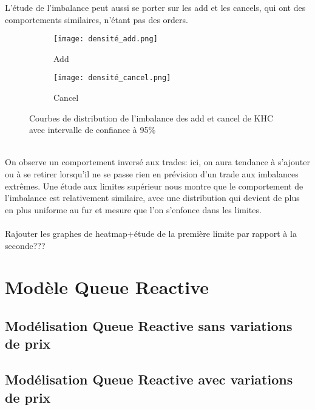 \documentclass[12pt,a4paper]{article}
\theoremstyle{definition}
\theoremstyle{remark}
\begin{document}
L'étude de l'imbalance peut aussi se porter sur les add et les cancels, qui ont des comportements similaires, n'étant pas des orders.
\begin{figure}[h!]
    \centering
    \begin{subfigure}[b]{0.48\textwidth}
        \centering
        \texttt{[image: densité\_add.png]}
        \caption{Add}
        \label{fig:imbalance}
    \end{subfigure}
    \hfill
    \begin{subfigure}[b]{0.48\textwidth}
        \centering
        \texttt{[image: densité\_cancel.png]}
        \caption{Cancel}
        \label{fig:densite_imbalance}
    \end{subfigure}
    \caption{Courbes de distribution de l'imbalance des add et cancel de KHC avec intervalle de confiance à 95\%}
    \label{fig:comparison}
\end{figure}
\\
On observe un comportement inversé aux trades: ici, on aura tendance à s'ajouter ou à se retirer lorsqu'il ne se passe rien en prévision d'un trade aux imbalances extrêmes. Une étude aux limites supérieur nous montre que le comportement de l'imbalance est relativement similaire, avec une distribution qui devient de plus en plus uniforme au fur et mesure que l'on s'enfonce dans les limites.
\\
\\
Rajouter les graphes de heatmap+étude de la première limite par rapport à la seconde???









\newpage
\vspace*{3cm}
\section{Modèle Queue Reactive}
\vspace*{2cm}

\subsection{Modélisation Queue Reactive sans variations de prix}
\subsection{Modélisation Queue Reactive avec variations de prix}
\end{document}
